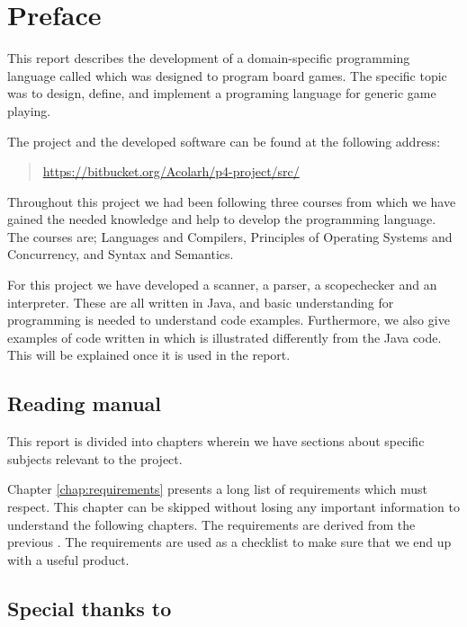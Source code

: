 \chapter*{Preface}
\label{chap:preface}

This report describes the development of a domain-specific programming
language called \productname{} which was designed to program board games. The 
specific topic was to design, define, and implement a programing language for 
generic game playing. 

The project and the developed software can be found at the following address:

\begin{quote}
  \url{https://bitbucket.org/Acolarh/p4-project/src/}  
\end{quote}

Throughout this project we had been following three courses from which we have
gained the needed knowledge and help to develop the programming language. The
courses are; Languages and Compilers, Principles of Operating Systems and
Concurrency, and Syntax and Semantics.

For this project we have developed a scanner, a parser, a scopechecker and an
interpreter. These are all written in Java, and basic understanding for
programming is needed to understand code examples. Furthermore, we also give
examples of code written in \productname{} which is illustrated differently from
the Java code. This will be explained once it is used in the report.

\section*{Reading manual}

This report is divided into chapters wherein we have sections about specific
subjects relevant to the project.

Chapter \ref{chap:requirements} presents a long list of requirements which
\productname{} must respect. This chapter can be skipped without losing any
important information to understand the following chapters. The requirements are 
derived from the previous . The requirements are used as
a checklist to make sure that we end up with a useful product.

\section*{Special thanks to}


